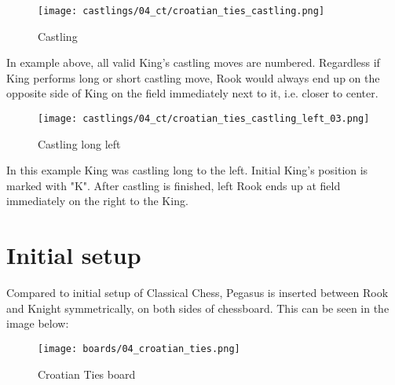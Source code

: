 \noindent
\begin{figure}[!h]
\texttt{[image: castlings/04\_ct/croatian\_ties\_castling.png]}
\caption{Castling}
\label{fig:croatian_ties_castling}
\end{figure}

In example above, all valid King's castling moves are numbered. Regardless if King performs
long or short castling move, Rook would always end up on the opposite side of King on the
field immediately next to it, i.e. closer to center.

\noindent
\begin{figure}[!h]
\texttt{[image: castlings/04\_ct/croatian\_ties\_castling\_left\_03.png]}
\caption{Castling long left}
\label{fig:croatian_ties_castling_left_03}
\end{figure}

In this example King was castling long to the left. Initial King's position is marked with "K".
After castling is finished, left Rook ends up at field immediately on the right to the King.

\clearpage %

\section*{Initial setup}

Compared to initial setup of Classical Chess, Pegasus is inserted between Rook and Knight
symmetrically, on both sides of chessboard. This can be seen in the image below:

\noindent
\begin{figure}[h]
\texttt{[image: boards/04\_croatian\_ties.png]}
\caption{Croatian Ties board}
\label{fig:04_croatian_ties}
\end{figure}

\clearpage %
